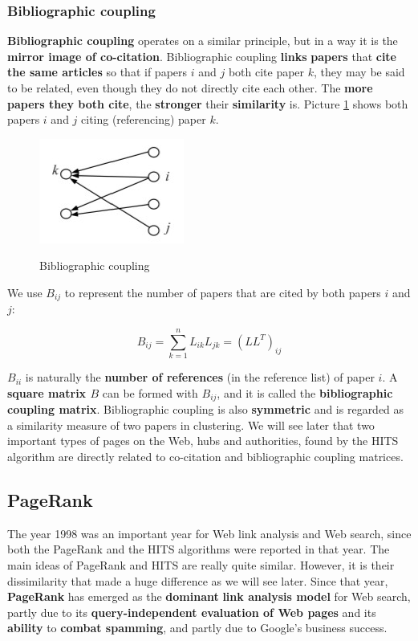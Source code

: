 \subsubsection{Bibliographic coupling}
\textbf{Bibliographic coupling} operates on a similar principle, but in a way it is the \textbf{mirror image of co-citation}. Bibliographic coupling \textbf{links} \textbf{papers} that \textbf{cite the same articles} so that if papers $i$ and $j$ both cite paper $k$, they may be said to be related, even though they do not directly cite each other. The \textbf{more papers they both cite}, the \textbf{stronger} their \textbf{similarity} is. Picture \ref{bib coup} shows both papers $i$ and $j$ citing (referencing) paper $k$.

\begin{figure}[h!]
		\centering
		\includegraphics[scale = 1.8]{img/biblio coupling.jpg}
		\label{bib coup}
        \caption{Bibliographic coupling}
\end{figure}

We use $B_{ij}$ to represent the number of papers that are cited by both
papers $i$ and $j$: 

$$
B_{ij} = \sum_{k = 1}^n L_{ik}L_{jk} = (LL^T)_{ij}
$$

$B_{ii}$ is naturally the \textbf{number of references} (in the reference list) of paper $i$. A \textbf{square matrix $B$} can be formed with $B_{ij}$, and it is called the \textbf{bibliographic coupling matrix}. Bibliographic coupling is also \textbf{symmetric} and is regarded as a similarity measure of two papers in clustering. We will see later that two important types of pages on the Web, hubs and authorities, found by the HITS algorithm are directly related to co-citation and bibliographic coupling matrices.

\subsection{PageRank}
The year 1998 was an important year for Web link analysis and Web search, since both the PageRank and the HITS algorithms were reported in that year. The main ideas of PageRank and HITS are really quite similar. However, it is their dissimilarity that made a huge difference as we will see later. Since that year, \textbf{PageRank} has emerged as the \textbf{dominant} \textbf{link analysis model} for Web search, partly due to its \textbf{query-independent evaluation of Web pages} and its \textbf{ability} to \textbf{combat spamming}, and partly due to Google’s business success. 

